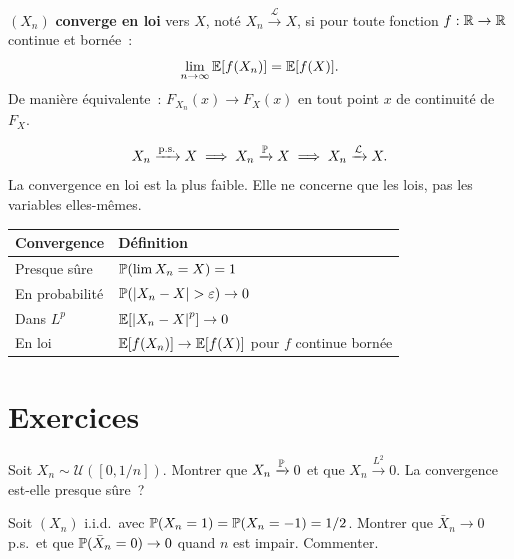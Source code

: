 \begin{definition}
$(X_n)$ \textbf{converge en loi} vers $X$, not\'e $X_n \xrightarrow{\mathcal{L}} X$,
si pour toute fonction $f : \mathbb{R} \to \mathbb{R}$ continue et born\'ee~:
\[
    \lim_{n \to \infty} \mathbb{E}[f(X_n)] = \mathbb{E}[f(X)].
\]
De mani\`ere \'equivalente~: $F_{X_n}(x) \to F_X(x)$ en tout point $x$ de
continuit\'e de $F_X$.
\end{definition}

\begin{theoreme}
\[
    X_n \xrightarrow{\text{p.s.}} X \implies X_n \xrightarrow{\mathbb{P}} X
    \implies X_n \xrightarrow{\mathcal{L}} X.
\]
La convergence en loi est la plus faible. Elle ne concerne que les lois, pas les
variables elles-m\^emes.
\end{theoreme}

\begin{formules}[title=\textbf{R\'esum\'e des convergences}]
\begin{center}
\begin{tabular}{ll}
    \toprule
    \textbf{Convergence} & \textbf{D\'efinition} \\
    \midrule
    Presque s\^ure & $\mathbb{P}(\lim X_n = X) = 1$ \\
    En probabilit\'e & $\mathbb{P}(\left| X_n - X \right| > \varepsilon) \to 0$ \\
    Dans $L^p$ & $\mathbb{E}[\left| X_n - X \right|^p] \to 0$ \\
    En loi & $\mathbb{E}[f(X_n)] \to \mathbb{E}[f(X)]$ pour $f$ continue born\'ee \\
    \bottomrule
\end{tabular}
\end{center}
\end{formules}

\section{Exercices}

\begin{exercice}
Soit $X_n \sim \mathcal{U}([0, 1/n])$. Montrer que $X_n \xrightarrow{\mathbb{P}} 0$
et que $X_n \xrightarrow{L^2} 0$. La convergence est-elle presque s\^ure~?
\end{exercice}

\begin{exercice}
Soit $(X_n)$ i.i.d.\ avec $\mathbb{P}(X_n = 1) = \mathbb{P}(X_n = -1) = 1/2$.
Montrer que $\bar{X}_n \to 0$ p.s.\ et que $\mathbb{P}(\bar{X}_n = 0) \to 0$ quand $n$
est impair. Commenter.
\end{exercice}

